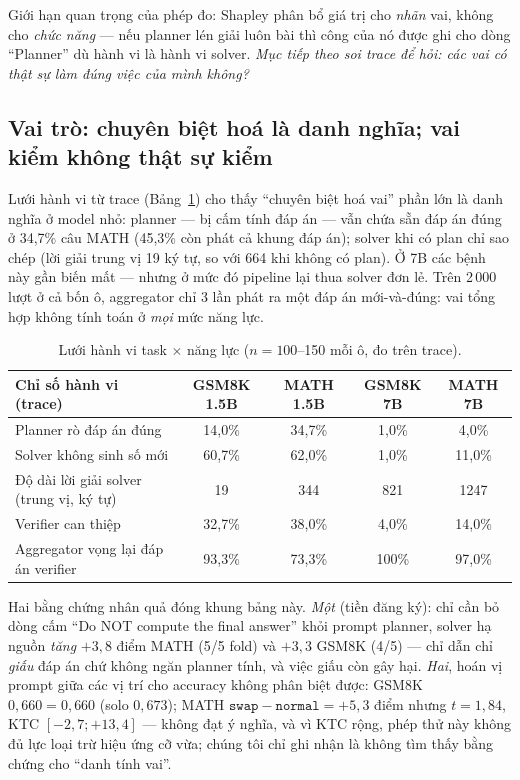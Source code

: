 \documentclass[11pt,a4paper]{article}
\begin{document}
Giới hạn quan trọng của phép đo: Shapley phân bổ giá trị cho \emph{nhãn} vai, không cho
\emph{chức năng} --- nếu planner lén giải luôn bài thì công của nó được ghi cho dòng
``Planner'' dù hành vi là hành vi solver. \emph{Mục tiếp theo soi trace để hỏi: các vai có
thật sự làm đúng việc của mình không?}

\subsection{Vai trò: chuyên biệt hoá là danh nghĩa; vai kiểm không thật sự kiểm}\label{sec:roles}

Lưới hành vi từ trace (Bảng~\ref{tab:behavior}) cho thấy ``chuyên biệt hoá vai'' phần lớn là
danh nghĩa ở model nhỏ: planner --- bị cấm tính đáp án --- vẫn chứa sẵn đáp án đúng ở 34,7\%
câu MATH (45,3\% còn phát cả khung đáp án); solver khi có plan chỉ sao chép (lời giải trung vị
19 ký tự, so với 664 khi không có plan). Ở 7B các bệnh này gần biến mất --- nhưng ở mức đó
pipeline lại thua solver đơn lẻ. Trên 2\,000 lượt ở cả bốn ô, aggregator chỉ 3 lần phát ra một
đáp án mới-và-đúng: vai tổng hợp không tính toán ở \emph{mọi} mức năng lực.

\begin{table}[t]\centering\small
\begin{tabular}{lcccc}\toprule
Chỉ số hành vi (trace) & GSM8K 1.5B & MATH 1.5B & GSM8K 7B & MATH 7B\\\midrule
Planner rò đáp án đúng & 14,0\% & 34,7\% & 1,0\% & 4,0\%\\
Solver không sinh số mới & 60,7\% & 62,0\% & 1,0\% & 11,0\%\\
Độ dài lời giải solver (trung vị, ký tự) & 19 & 344 & 821 & 1247\\
Verifier can thiệp & 32,7\% & 38,0\% & 4,0\% & 14,0\%\\
Aggregator vọng lại đáp án verifier & 93,3\% & 73,3\% & 100\% & 97,0\%\\\bottomrule
\end{tabular}
\caption{Lưới hành vi task $\times$ năng lực ($n=100$--150 mỗi ô, đo trên trace).}
\label{tab:behavior}
\end{table}

Hai bằng chứng nhân quả đóng khung bảng này. \emph{Một} (tiền đăng ký): chỉ cần bỏ dòng cấm
``Do NOT compute the final answer'' khỏi prompt planner, solver hạ nguồn \emph{tăng} $+3{,}8$
điểm MATH (5/5 fold) và $+3{,}3$ GSM8K (4/5) --- chỉ dẫn chỉ \emph{giấu} đáp án chứ không
ngăn planner tính, và việc giấu còn gây hại. \emph{Hai}, hoán vị prompt giữa các vị trí cho
accuracy không phân biệt được: GSM8K $0{,}660 = 0{,}660$ (solo $0{,}673$); MATH
$\texttt{swap}-\texttt{normal} = +5{,}3$ điểm nhưng $t=1{,}84$, KTC $[-2{,}7;+13{,}4]$ ---
không đạt ý nghĩa, và vì KTC rộng, phép thử này không đủ lực loại trừ hiệu ứng cỡ vừa; chúng
tôi chỉ ghi nhận là không tìm thấy bằng chứng cho ``danh tính vai''.
\end{document}

